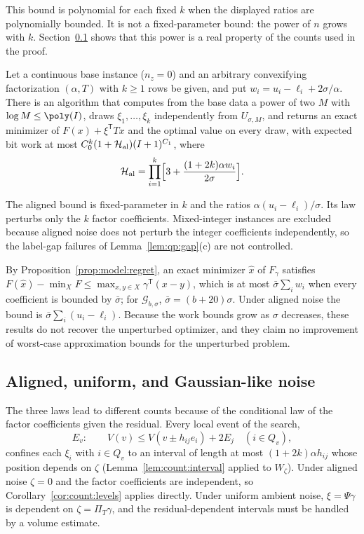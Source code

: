 This bound is polynomial for each fixed $k$ when the displayed ratios are
polynomially bounded. It is not a fixed-parameter bound: the power of $n$
grows with $k$. Section~\ref{sec:qp:ambient} shows that this power is a real
property of the counts used in the proof.

\begin{theorem}\label{thm:qp:aligned}
Let a continuous base instance ($n_z=0$) and an arbitrary convexifying
factorization $(\alpha,T)$ with $k\ge1$ rows be given, and put
$w_i=u_i-\ell_i+2\sigma/\alpha$. There is an algorithm that computes from the
base data a power of two $M$ with $\log M\le\poly(I)$, draws
$\xi_1,\dots,\xi_k$ independently from $U_{\sigma,M}$, and returns an
exact minimizer of $F(x)+\xi^{\mathsf T} Tx$ and the optimal value on every draw,
with expected bit work at most $C_0^k(1+\mathcal H_{\rm al})(I+1)^{C_1}$, where
\[
 \mathcal H_{\rm al}=\prod_{i=1}^k\Bigl[3+\frac{(1+2k)\alpha w_i}{2\sigma}\Bigr].
\]
\end{theorem}

The aligned bound is fixed-parameter in $k$ and the ratios
$\alpha(u_i-\ell_i)/\sigma$. Its law perturbs only the $k$ factor
coefficients. Mixed-integer instances are excluded because aligned noise does
not perturb the integer coefficients independently, so the label-gap failures
of Lemma~\ref{lem:qp:gap}(c) are not controlled.

\begin{remark}\label{rem:qp:regret}
By Proposition~\ref{prop:model:regret}, an exact minimizer $\hat x$ of
$F_\gamma$ satisfies $F(\hat x)-\min_XF\le\max_{x,y\in X}\gamma^{\mathsf T}(x-y)$,
which is at most $\bar\sigma\sum_iw_i$ when every coefficient is bounded
by $\bar\sigma$; for $\mathcal G_{b,\sigma}$, $\bar\sigma=(b+20)\sigma$.
Under aligned noise the bound is $\bar\sigma\sum_i(u_i-\ell_i)$. Because the
work bounds grow as $\sigma$ decreases, these results do not recover the
unperturbed optimizer, and they claim no improvement of worst-case
approximation bounds for the unperturbed problem.
\end{remark}

\subsection{Aligned, uniform, and Gaussian-like noise}\label{sec:qp:ambient}

The three laws lead to different counts because of the conditional law of
the factor coefficients given the residual. Every local event of the search,
\[
 E_v:\qquad V(v)\le V(v\pm h_{ij}e_i)+2E_j\quad(i\in Q_v),
\]
confines each $\xi_i$ with $i\in Q_v$ to an interval of length at most
$(1+2k)\alpha h_{ij}$ whose position depends on $\zeta$
(Lemma~\ref{lem:count:interval} applied to $W_\zeta$). Under aligned noise
$\zeta=0$ and the factor coefficients are independent, so
Corollary~\ref{cor:count:levels} applies directly. Under uniform ambient
noise, $\xi=\Psi\gamma$ is dependent on $\zeta=\Pi_T\gamma$, and the
residual-dependent intervals must be handled by a volume estimate.

